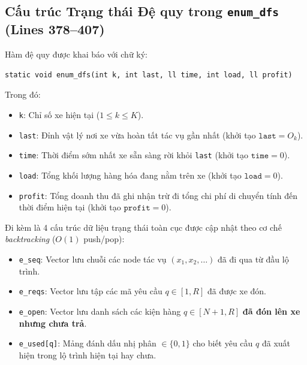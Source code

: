 \documentclass[11pt,a4paper]{article}
\theoremstyle{definition}
\begin{document}
\subsection{Cấu trúc Trạng thái Đệ quy trong \texttt{enum\_dfs} (Lines 378--407)}
Hàm đệ quy được khai báo với chữ ký:
\begin{lstlisting}
static void enum_dfs(int k, int last, ll time, int load, ll profit)
\end{lstlisting}
Trong đó:
\begin{itemize}[leftmargin=1.5em]
    \item \texttt{k}: Chỉ số xe hiện tại ($1 \le k \le K$).
    \item \texttt{last}: Đỉnh vật lý nơi xe vừa hoàn tất tác vụ gần nhất (khởi tạo $\texttt{last} = O_k$).
    \item \texttt{time}: Thời điểm sớm nhất xe sẵn sàng rời khỏi \texttt{last} (khởi tạo $\texttt{time} = 0$).
    \item \texttt{load}: Tổng khối lượng hàng hóa đang nằm trên xe (khởi tạo $\texttt{load} = 0$).
    \item \texttt{profit}: Tổng doanh thu đã ghi nhận trừ đi tổng chi phí di chuyển tính đến thời điểm hiện tại (khởi tạo $\texttt{profit} = 0$).
\end{itemize}
Đi kèm là 4 cấu trúc dữ liệu trạng thái toàn cục được cập nhật theo cơ chế \textit{backtracking} ($O(1)$ push/pop):
\begin{itemize}[leftmargin=1.5em]
    \item \texttt{e\_seq}: Vector lưu chuỗi các node tác vụ $(x_1, x_2, \dots)$ đã đi qua từ đầu lộ trình.
    \item \texttt{e\_reqs}: Vector lưu tập các mã yêu cầu $q \in [1, R]$ đã được xe đón.
    \item \texttt{e\_open}: Vector lưu danh sách các kiện hàng $q \in [N+1, R]$ \textbf{đã đón lên xe nhưng chưa trả}.
    \item \texttt{e\_used[q]}: Mảng đánh dấu nhị phân $\in \{0, 1\}$ cho biết yêu cầu $q$ đã xuất hiện trong lộ trình hiện tại hay chưa.
\end{itemize}
\end{document}
